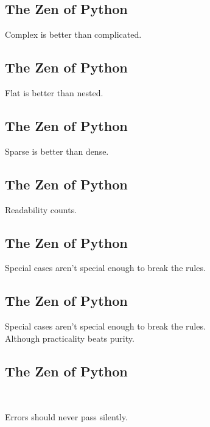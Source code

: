 \documentclass[xga]{xdvislides}
\begin{document}
\subsection{The Zen of Python}
\begin{center}
    Complex is better than complicated.
\end{center}

\subsection{The Zen of Python}
\begin{center}
    Flat is better than nested.
\end{center}

\subsection{The Zen of Python}
\begin{center}
    Sparse is better than dense.
\end{center}

\subsection{The Zen of Python}
\begin{center}
    Readability counts.
\end{center}

\subsection{The Zen of Python}
\begin{center}
    Special cases aren't special enough to break the rules.
\end{center}

\subsection{The Zen of Python}
\begin{center}
    Special cases aren't special enough to break the rules. \\
\addvspace{.5in}
    Although practicality beats purity.
\end{center}

\subsection{The Zen of Python}
\\
\begin{center}
    Errors should never pass silently.
\end{center}
\end{document}
